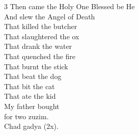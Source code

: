 \documentclass[12pt]{article}
\begin{document}
\begin{minipage}[t]{\textwidth}
\begin{multicols}{3}
Then came the Holy One Blessed be He \\
And slew the Angel of Death \\
That killed the butcher \\
That slaughtered the ox \\
That drank the water \\
That quenched the fire \\
That burnt the stick \\
That beat the dog \\
That bit the cat \\
That ate the kid \\
My father bought \\
for two zuzim. \\
Chad gadya (2x).

\end{multicols}
\end{minipage}
\pagebreak
\end{document}
